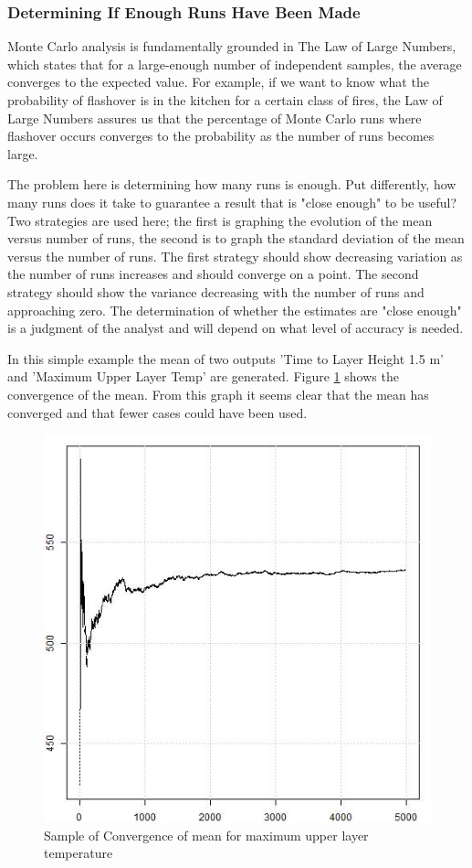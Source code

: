 \documentclass[12pt,twoside]{book}
\begin{document}
\subsubsection{Determining If Enough Runs Have Been Made}

Monte Carlo analysis is fundamentally grounded in The Law of Large Numbers, which states that for a large-enough number of independent samples, the average converges to the expected value. For example, if we want to know what the probability of flashover is in the kitchen for a certain class of fires, the Law of Large Numbers assures us that the percentage of Monte Carlo runs where flashover occurs converges to the probability as the number of runs becomes large.

The problem here is determining how many runs is enough. Put differently, how many runs does it take to guarantee a result that is "close enough" to be useful? Two strategies are used here; the first is graphing the evolution of the mean versus number of runs, the second is to graph the standard deviation of the mean versus the number of runs. The first strategy should show decreasing variation as the number of runs increases and should converge on a point. The second strategy should show the variance decreasing with the number of runs and approaching zero. The determination of whether the estimates are "close enough" is a judgment of the analyst and will depend on what level of accuracy is needed.

In this simple example the mean of two outputs {\ct 'Time to Layer Height 1.5 m'} and {\ct 'Maximum Upper Layer Temp'} are generated. Figure \ref{simple_max_temp_mean} shows the convergence of the mean. From this graph it seems clear that the mean has converged and that fewer cases could have been used.

\begin{figure}[h!]
\centering
\includegraphics[width=4.5in]{FIGURES/simple_max_temp_mean.jpeg}
\caption{Sample of Convergence of mean for maximum upper layer temperature}
\label{simple_max_temp_mean}
\end{figure}
\end{document}
